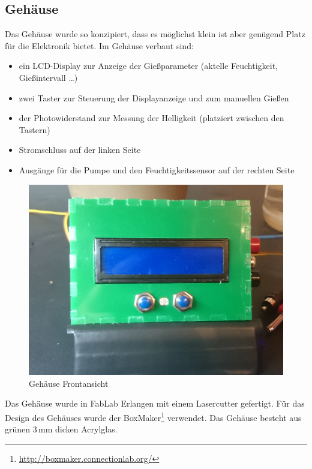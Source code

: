 	
	
\subsection{Gehäuse}
	Das Gehäuse wurde so konzipiert, dass es möglichst klein ist aber genügend Platz für die Elektronik bietet.
	Im Gehäuse verbaut sind:
\begin{itemize}
	\item ein LCD-Display zur Anzeige der Gießparameter (aktelle Feuchtigkeit, Gießintervall \dots)
	\item zwei Taster zur Steuerung der Displayanzeige und zum manuellen Gießen
	\item der Photowiderstand zur Messung der Helligkeit (platziert zwischen den Tastern)
	\item Stromschluss auf der linken Seite
	\item Ausgänge für die Pumpe und den Feuchtigkeitssensor auf der rechten Seite

\end{itemize}	

	\begin{figure}[!h]
	\centering
	\includegraphics[width=0.9\linewidth]{bilder/_boxFron1.jpg}	
	\caption{Gehäuse Frontansicht}
	\label{fig-Gehäuse}
	\end{figure}
	
Das Gehäuse wurde in FabLab Erlangen mit einem Lasercutter gefertigt. 
Für das Design des Gehäuses wurde der BoxMaker\footnote{ \href{http://boxmaker.connectionlab.org/}{http://boxmaker.connectionlab.org/}} verwendet. 
Das Gehäuse besteht aus grünen 3\,mm dicken Acrylglas.
	
